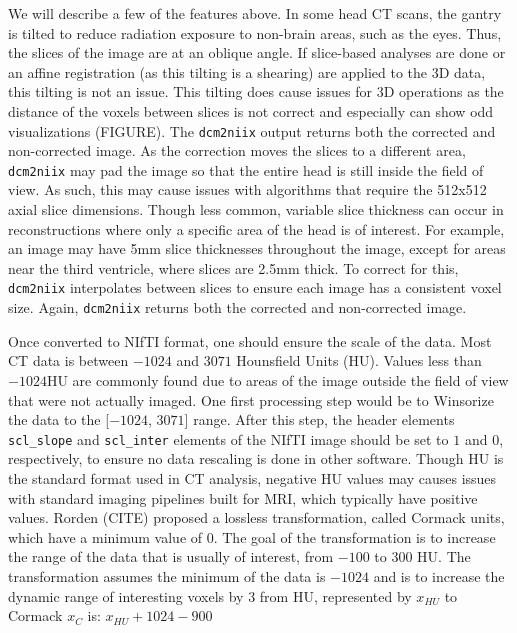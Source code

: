 \documentclass[]{elsarticle} %
\begin{document}
We will describe a few of the features above. In some head CT scans, the
gantry is tilted to reduce radiation exposure to non-brain areas, such
as the eyes. Thus, the slices of the image are at an oblique angle. If
slice-based analyses are done or an affine registration (as this tilting
is a shearing) are applied to the 3D data, this tilting is not an issue.
This tilting does cause issues for 3D operations as the distance of the
voxels between slices is not correct and especially can show odd
visualizations (FIGURE). The \texttt{dcm2niix} output returns both the
corrected and non-corrected image. As the correction moves the slices to
a different area, \texttt{dcm2niix} may pad the image so that the entire
head is still inside the field of view. As such, this may cause issues
with algorithms that require the 512x512 axial slice dimensions. Though
less common, variable slice thickness can occur in reconstructions where
only a specific area of the head is of interest. For example, an image
may have 5mm slice thicknesses throughout the image, except for areas
near the third ventricle, where slices are 2.5mm thick. To correct for
this, \texttt{dcm2niix} interpolates between slices to ensure each image
has a consistent voxel size. Again, \texttt{dcm2niix} returns both the
corrected and non-corrected image.

Once converted to NIfTI format, one should ensure the scale of the data.
Most CT data is between \(-1024\) and \(3071\) Hounsfield Units (HU).
Values less than \(-1024\)HU are commonly found due to areas of the
image outside the field of view that were not actually imaged. One first
processing step would be to Winsorize the data to the {[}\(-1024\),
\(3071\){]} range. After this step, the header elements
\texttt{scl\_slope} and \texttt{scl\_inter} elements of the NIfTI image
should be set to \(1\) and \(0\), respectively, to ensure no data
rescaling is done in other software. Though HU is the standard format
used in CT analysis, negative HU values may causes issues with standard
imaging pipelines built for MRI, which typically have positive values.
Rorden (CITE) proposed a lossless transformation, called Cormack units,
which have a minimum value of \(0\). The goal of the transformation is
to increase the range of the data that is usually of interest, from
\(-100\) to \(300\) HU. The transformation assumes the minimum of the
data is \(-1024\) and is to increase the dynamic range of interesting
voxels by 3 from HU, represented by \(x_{HU}\) to Cormack \(x_{C}\) is:
\(x_{HU} + 1024 - 900\)
\end{document}
